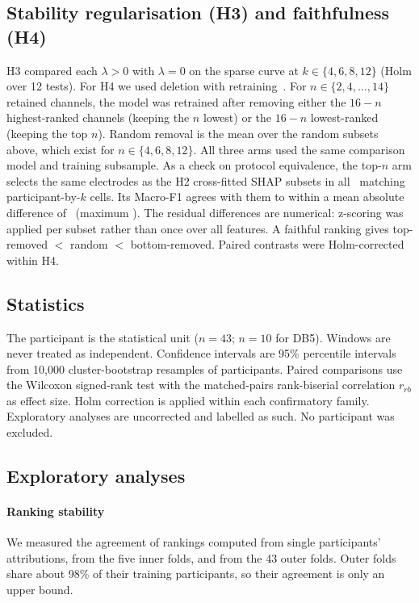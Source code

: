 \subsection{Stability regularisation (H3) and faithfulness (H4)}
H3 compared each $\lambda > 0$ with $\lambda = 0$ on the sparse curve at $k \in \{4, 6, 8, 12\}$ (Holm over 12 tests). For H4 we used deletion with retraining~\cite{hooker2019benchmark}. For $n \in \{2, 4, \ldots, 14\}$ retained channels, the model was retrained after removing either the $16 - n$ highest-ranked channels (keeping the $n$ lowest) or the $16 - n$ lowest-ranked (keeping the top $n$). Random removal is the mean over the random subsets above, which exist for $n \in \{4, 6, 8, 12\}$. All three arms used the same comparison model and training subsample. As a check on protocol equivalence, the top-$n$ arm selects the same electrodes as the H2 cross-fitted SHAP subsets in all \FaithProtocolCells\ matching participant-by-$k$ cells. Its Macro-F1 agrees with them to within a mean absolute difference of \FaithProtocolMeanDiff\ (maximum \FaithProtocolMaxDiff). The residual differences are numerical: z-scoring was applied per subset rather than once over all features. A faithful ranking gives top-removed $<$ random $<$ bottom-removed. Paired contrasts were Holm-corrected within H4.

\subsection{Statistics}
The participant is the statistical unit ($n = 43$; $n = 10$ for DB5). Windows are never treated as independent. Confidence intervals are 95\% percentile intervals from 10,000 cluster-bootstrap resamples of participants. Paired comparisons use the Wilcoxon signed-rank test with the matched-pairs rank-biserial correlation $r_{rb}$ as effect size. Holm correction is applied within each confirmatory family. Exploratory analyses are uncorrected and labelled as such. No participant was excluded.

\subsection{Exploratory analyses}
\paragraph{Ranking stability} We measured the agreement of rankings computed from single participants' attributions, from the five inner folds, and from the 43 outer folds. Outer folds share about 98\% of their training participants, so their agreement is only an upper bound.

